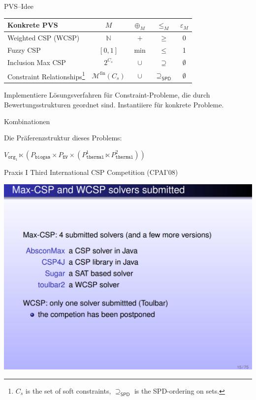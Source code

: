 \documentclass[handout,10pt,xcolor={dvipsnames},fleqn]{beamer}
\newcommand{\prosumer}[1]{\ensuremath{\mathtt{#1}}}
\newcommand{\biogas}{biogas}
\newcommand{\thermal}{thermal}
\newcommand{\ev}{EV}
\begin{document}
\begin{frame}[fragile]{PVS--Idee}
\begin{center}
\begin{tabular}{l|c|c|c|c}
\textbf{Konkrete PVS} & $M$ & $\oplus_M$ & $\leq_M$ & $\varepsilon_M$ \\ 
\hline 
Weighted CSP (WCSP)& $\mathbb{N}$ & $+$ & $\geq$ & $0$ \\ 
Fuzzy CSP & $[0,1]$ & $\min$ & $\leq$  & 1 \\ 
Inclusion Max CSP & $2^{C_s}$ & $\cup$ & $\supseteq$  & $\emptyset$ \\ 
Constraint Relationships\footnote{$C_s$ is the set of soft constraints, $\supseteq_{\mathsf{SPD}}$ is the SPD-ordering on sets.} &$\mathcal{M}^{\mathrm{fin}} (C_s)$ & $\cup$ & $\supseteq_{\mathsf{SPD}}$ & $\emptyset$ \\ 
\end{tabular} 
\end{center}

\begin{parchment}[Hauptidee]
Implementiere Lösungsverfahren für Constraint-Probleme, die durch Bewertungsstrukturen geordnet sind. Instantiiere für konkrete Probleme.
\end{parchment}
\end{frame}


\begin{frame}{Kombinationen~\cite{SchiendorferPvs2015}}
\fontsize{8pt}{7.2}\selectfont

Die Präferenzstruktur dieses Problems:
\vspace*{2ex}

\qquad $
  V_{\mathtt{org}_1} \ltimes (P_{\prosumer{\biogas}} \times P_{\prosumer{\ev}} \times (P_{\prosumer{\thermal}}^1 \ltimes P_{\prosumer{\thermal}}^2))
$
%
\end{frame}


\begin{frame}{Praxis I}
Third International CSP Competition (CPAI’08)
\begin{center}
\includegraphics[width=.8\textwidth]{img/cpai08.png}
\end{center}
\end{frame}
\end{document}
